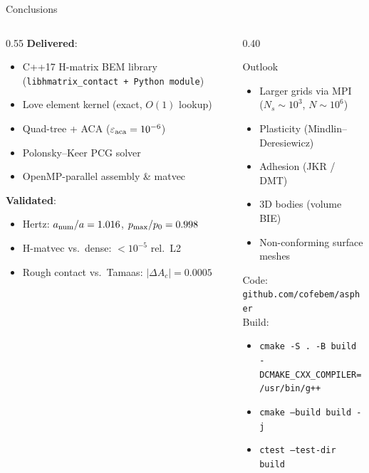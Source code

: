 \begin{frame}{Conclusions}
\begin{columns}[T]
\begin{column}{0.55\textwidth}
  \textbf{Delivered}:
  \begin{itemize}
    \item C++17 H-matrix BEM library
      (\texttt{libhmatrix\_contact + Python module})
    \item Love element kernel (exact, $O(1)$ lookup)
    \item Quad-tree + ACA ($\varepsilon_{\rm aca}=10^{-6}$)
    \item Polonsky--Keer PCG solver
    \item OpenMP-parallel assembly \& matvec
  \end{itemize}

  \vspace{0.5em}
  \textbf{Validated}:
  \begin{itemize}
    \item Hertz: $a_{\rm num}/a = 1.016$,
      $p_{\rm max}/p_0 = 0.998$
    \item H-matvec vs.\ dense: $<10^{-5}$ rel.\ L2
    \item Rough contact vs.\ Tamaas: $|\Delta A_c|=0.0005$
  \end{itemize}
\end{column}
\begin{column}{0.40\textwidth}
  \begin{block}{Outlook}
    \begin{itemize}
      \item Larger grids via MPI\\
        ($N_s \sim 10^3$, $N\sim10^6$)
      \item Plasticity (Mindlin--Deresiewicz)
      \item Adhesion (JKR / DMT)
      \item 3D bodies (volume BIE)
      \item Non-conforming surface meshes
    \end{itemize}
  \end{block}
  \vspace{0.4em}
  \small
  Code: \texttt{github.com/cofebem/aspher} \\
  Build:
  \begin{itemize}
    \item \texttt{cmake -S . -B build}\\
      \texttt{\;\;-DCMAKE\_CXX\_COMPILER=/usr/bin/g++}
    \item \texttt{cmake --build build -j}
    \item \texttt{ctest --test-dir build}
  \end{itemize}
\end{column}
\end{columns}
\end{frame}
